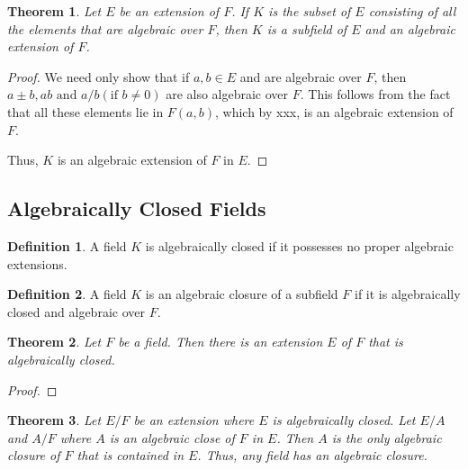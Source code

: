 \documentclass[draft]{article}
\newtheorem{thm}{Theorem}[section]
\theoremstyle{definition}
\newtheorem{defn}{Definition}[section]
\theoremstyle{remark}
\begin{document}
            \begin{thm}
                Let $E$ be an extension of $F$. If $K$ is the subset of $E$ consisting of all the elements that are algebraic over $F$, then $K$ is a subfield of $E$ and an algebraic extension of $F$.
            \end{thm}
            
            \begin{proof}
                We need only show that if $a, b \in E$ and are algebraic over $F$, then $a \pm b, ab \text{ and } a/b (\text{if } b \neq 0)$ are also algebraic over $F$. This follows from the fact that all these elements lie in $F(a, b)$, which by xxx, is an algebraic extension of $F$.\par
                Thus, $K$ is an algebraic extension of $F$ in $E$.
            \end{proof}
            
        \subsection{Algebraically Closed Fields}
        
            \begin{defn}
                A field $K$ is algebraically closed if it possesses no proper algebraic extensions.
            \end{defn}
            
            \begin{defn}
                A field $K$ is an algebraic closure of a subfield $F$ if it is algebraically closed and algebraic over $F$.
            \end{defn}
            
            \begin{thm}
                Let $F$ be a field. Then there is an extension $E$ of $F$ that is algebraically closed.
            \end{thm}
            
            \begin{proof}
                
            \end{proof}
            
            \begin{thm}
                Let $E/F$ be an extension where $E$ is algebraically closed. Let $E/A$ and $A/F$ where $A$ is an algebraic close of $F$ in $E$. Then $A$ is the only algebraic closure of $F$ that is contained in $E$. Thus, any field has an algebraic closure.
            \end{thm}
            
\end{document}

